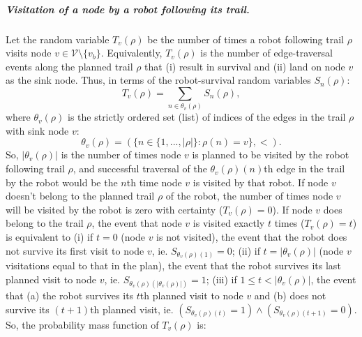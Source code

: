 \documentclass[11pt, oneside]{article}
\begin{document}
\subparagraph{Visitation of a node by a robot following its trail.} 
Let the random variable $T_v(\rho)$ be the number of times a robot following trail $\rho$ visits node $v\in \mathcal{V} \setminus \{v_b\}$. 
Equivalently, $T_v(\rho)$ is the number of edge-traversal events along the planned trail $\rho$ that (i) result in survival and (ii) land on node $v$ as the sink node. 
Thus, in terms of the robot-survival random variables $S_n(\rho)$:
\begin{equation}
	T_v(\rho) = \sum_{n \in \theta_v(\rho) } S_n(\rho), %
\end{equation}
where $\theta_v(\rho)$ is the strictly ordered set (list) of indices of the edges in the trail $\rho$ with sink node $v$:
\begin{equation}
	\theta_v(\rho) = (\{ n \in \{1, ..., \lvert \rho \rvert\} : \rho(n) = v\}, <).
\end{equation} So, $\lvert \theta_v(\rho) \rvert$ is the number of times node $v$ is planned to be visited by the robot following trail $\rho$, and successful traversal of the $\theta_v(\rho)(n)$th edge in the trail by the robot would be the $n$th time node $v$ is visited by that robot.
If node $v$ doesn't belong to the planned trail $\rho$ of the robot, the number of times node $v$ will be visited by the robot is zero with certainty ($T_v(\rho)=0$).
If node $v$ does belong to the trail $\rho$, the event that node $v$ is visited exactly $t$ times ($T_v(\rho)=t$) is equivalent to
(i) if $t=0$ (node $v$ is not visited), the event that the robot does not survive its first visit to node $v$, ie. $S_{\theta_v(\rho)(1)}=0$;
(ii) if $t=\lvert \theta_v(\rho)\rvert$ (node $v$ visitations equal to that in the plan), the event that the robot survives its last planned visit to node $v$, ie. $S_{\theta_v(\rho)(\lvert \theta_v(\rho) \rvert)}=1$;
(iii) if $1 \leq t < \lvert \theta_v(\rho ) \rvert$, the event that (a) the robot survives its $t$th planned visit to node $v$ and (b) does not survive its $(t+1)$th planned visit, ie. $(S_{\theta_v(\rho)(t)}=1) \land (S_{\theta_v(\rho)(t+1)}=0)$. So, the probability mass function of $T_v(\rho)$ is:
\end{document}

